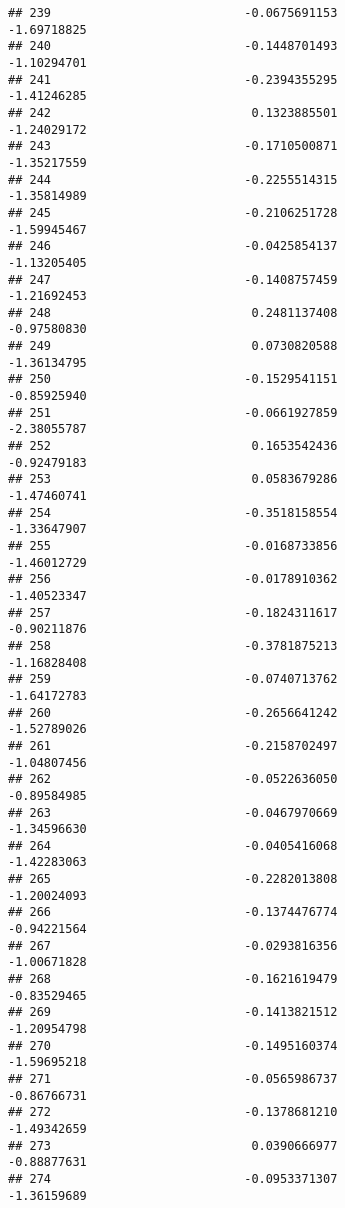 \documentclass[
]{article}
\begin{document}
\begin{verbatim}
## 239                           -0.0675691153                -1.69718825
## 240                           -0.1448701493                -1.10294701
## 241                           -0.2394355295                -1.41246285
## 242                            0.1323885501                -1.24029172
## 243                           -0.1710500871                -1.35217559
## 244                           -0.2255514315                -1.35814989
## 245                           -0.2106251728                -1.59945467
## 246                           -0.0425854137                -1.13205405
## 247                           -0.1408757459                -1.21692453
## 248                            0.2481137408                -0.97580830
## 249                            0.0730820588                -1.36134795
## 250                           -0.1529541151                -0.85925940
## 251                           -0.0661927859                -2.38055787
## 252                            0.1653542436                -0.92479183
## 253                            0.0583679286                -1.47460741
## 254                           -0.3518158554                -1.33647907
## 255                           -0.0168733856                -1.46012729
## 256                           -0.0178910362                -1.40523347
## 257                           -0.1824311617                -0.90211876
## 258                           -0.3781875213                -1.16828408
## 259                           -0.0740713762                -1.64172783
## 260                           -0.2656641242                -1.52789026
## 261                           -0.2158702497                -1.04807456
## 262                           -0.0522636050                -0.89584985
## 263                           -0.0467970669                -1.34596630
## 264                           -0.0405416068                -1.42283063
## 265                           -0.2282013808                -1.20024093
## 266                           -0.1374476774                -0.94221564
## 267                           -0.0293816356                -1.00671828
## 268                           -0.1621619479                -0.83529465
## 269                           -0.1413821512                -1.20954798
## 270                           -0.1495160374                -1.59695218
## 271                           -0.0565986737                -0.86766731
## 272                           -0.1378681210                -1.49342659
## 273                            0.0390666977                -0.88877631
## 274                           -0.0953371307                -1.36159689

\end{verbatim}
\end{document}
